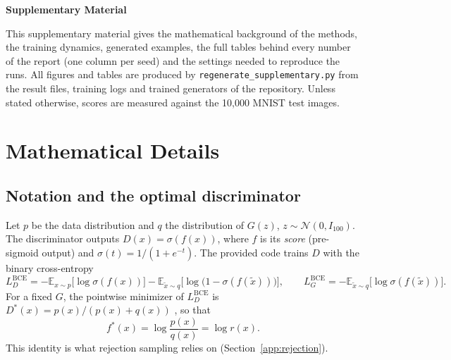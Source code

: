 
\begin{center}
  {\LARGE\bfseries Supplementary Material}
\end{center}

This supplementary material gives the mathematical background of the methods, the training dynamics, generated examples, the full tables behind every number of the report (one column per seed) and the settings needed to reproduce the runs. All figures and tables are produced by \texttt{regenerate\_supplementary.py} from the result files, training logs and trained generators of the repository. Unless stated otherwise, scores are measured against the 10,000 MNIST test images.

\startcontents[supp]

\clearpage
\section{Mathematical Details}
\label{app:math}

\subsection{Notation and the optimal discriminator}
Let $p$ be the data distribution and $q$ the distribution of $G(z)$, $z\sim\mathcal N(0,I_{100})$. The discriminator outputs $D(x)=\sigma(f(x))$, where $f$ is its \emph{score} (pre-sigmoid output) and $\sigma(t)=1/(1+e^{-t})$. The provided code trains $D$ with the binary cross-entropy
\begin{equation}
  L_D^{\mathrm{BCE}} = -\mathbb E_{x\sim p}\big[\log\sigma(f(x))\big]-\mathbb E_{\tilde x\sim q}\big[\log\big(1-\sigma(f(\tilde x))\big)\big],
  \qquad L_G^{\mathrm{BCE}} = -\mathbb E_{\tilde x\sim q}\big[\log\sigma(f(\tilde x))\big].
\end{equation}
For a fixed $G$, the pointwise minimizer of $L_D^{\mathrm{BCE}}$ is $D^*(x)=p(x)/(p(x)+q(x))$ \cite{goodfellow2014}, so that
\begin{equation}
  f^*(x)=\log\frac{p(x)}{q(x)}=\log r(x).
  \label{eq:logratio}
\end{equation}
This identity is what rejection sampling relies on (Section~\ref{app:rejection}).

